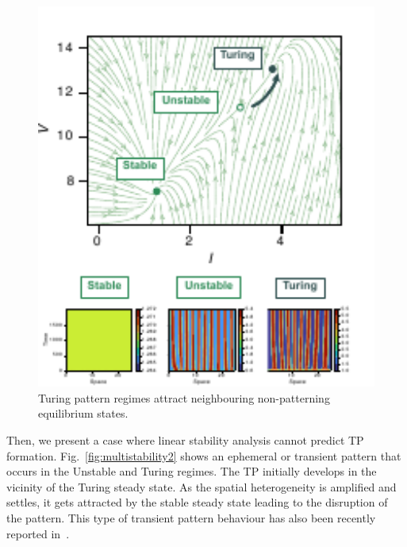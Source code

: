 \begin{figure}[H] %
    \centering
    \begin{adjustbox}{center}
        \includegraphics[width=1\textwidth]{chapters/Chapter 1/multistability1} %
    \end{adjustbox}
    \caption{Turing pattern regimes attract neighbouring non-patterning equilibrium states.}
    \label{fig:multistability1} %
\end{figure}

Then, we present a case where linear stability analysis cannot predict TP formation. Fig.~\ref{fig:multistability2} shows an ephemeral or transient pattern that occurs in the Unstable and Turing regimes.
The TP initially develops in the vicinity of the Turing steady state.
As the spatial heterogeneity is amplified and settles, it gets attracted by the stable steady state leading to the disruption of the pattern.
This type of transient pattern behaviour has also been recently reported in~\cite{Krause2023}.

